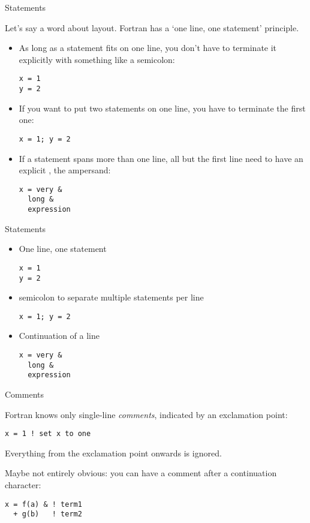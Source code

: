  {Statements}

Let's say a word about layout. Fortran has a `one line, one statement'
principle.
\begin{itemize}
\item As long as a statement fits on one line, you don't have to
  terminate it explicitly with something like a semicolon:
\begin{verbatim}
x = 1
y = 2
\end{verbatim}
\item If you want to put two statements on one line, you have to
  terminate the first one:
\begin{verbatim}
x = 1; y = 2
\end{verbatim}
\item If a statement spans more than one line, all but the first line
  need to have an explicit , the ampersand:
\begin{verbatim}
x = very &
  long &
  expression
\end{verbatim}
\end{itemize}

\begin{slide}{Statements}
  \label{sl:fstatement}
  \begin{itemize}
  \item One line, one statement
\begin{verbatim}
x = 1
y = 2
\end{verbatim}
\item semicolon to separate multiple statements per line
\begin{verbatim}
x = 1; y = 2
\end{verbatim}
\item Continuation of a line
\begin{verbatim}
x = very &
  long &
  expression
\end{verbatim}
  \end{itemize}
\end{slide}

 {Comments}

Fortran knows only single-line
\emph{comments},
indicated by an exclamation point:
\begin{verbatim}
x = 1 ! set x to one
\end{verbatim}
Everything from the exclamation point onwards is ignored.

Maybe not entirely obvious: you can have a comment after a
continuation character:
\begin{verbatim}
x = f(a) & ! term1 
  + g(b)   ! term2
\end{verbatim}


